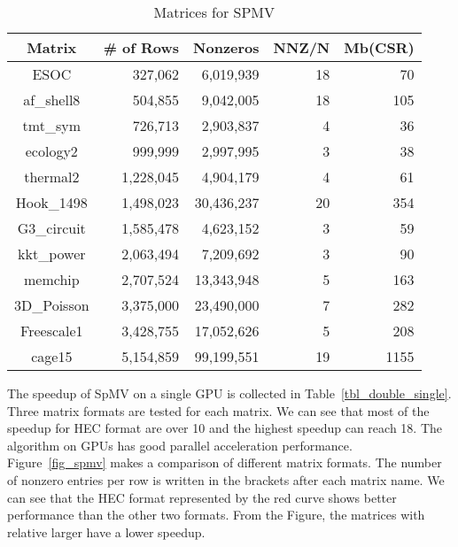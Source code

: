 \documentclass[runningheads,a4paper]{llncs}
\begin{document}
{\begin{table}[!htb]
\centering
\caption{Matrices for SPMV}
\begin{tabular}{|c|r|r|r|r|} \hline
\bfseries Matrix    & \bfseries \# of Rows  & \bfseries Nonzeros    & \bfseries NNZ/N & \bfseries  Mb(CSR)\\ \hline
ESOC	           & 327,062	    &6,019,939	&18	       &70\\ \hline
af\_shell8	       & 504,855	    &9,042,005	&18	       &105\\ \hline
tmt\_sym	       & 726,713	    &2,903,837	&4	       &36\\ \hline
ecology2	       & 999,999	    &2,997,995	&3	       &38\\ \hline
thermal2	       & 1,228,045	    &4,904,179	&4	       &61\\ \hline
Hook\_1498	       & 1,498,023	    &30,436,237	&20	       &354\\ \hline
G3\_circuit	       & 1,585,478	    &4,623,152	&3	       &59\\ \hline
kkt\_power	       & 2,063,494	    &7,209,692	&3	       &90\\ \hline
memchip	           & 2,707,524	    &13,343,948	&5	       &163\\ \hline
3D\_Poisson	       & 3,375,000	    &23,490,000	&7	       &282\\ \hline
Freescale1	       & 3,428,755	    &17,052,626	&5	       &208\\ \hline
cage15	           & 5,154,859	    &99,199,551	&19	       &1155\\ \hline
\end{tabular}
\label{tbl_spmv_matrix}
\end{table}

The speedup of SpMV on a single GPU is collected in Table~\ref{tbl_double_single}. Three matrix formats are tested for each matrix. We can see that most of the speedup for HEC format are over 10 and the highest speedup can reach 18. The algorithm on GPUs has good parallel acceleration performance. Figure~\ref{fig_spmv} makes a comparison of different matrix formats. The number of nonzero entries per row is written in the brackets after each matrix name. We can see that the HEC format represented by the red curve shows better performance than the other two formats. From the Figure, the matrices with relative larger  have a lower speedup.

}
\end{document}
